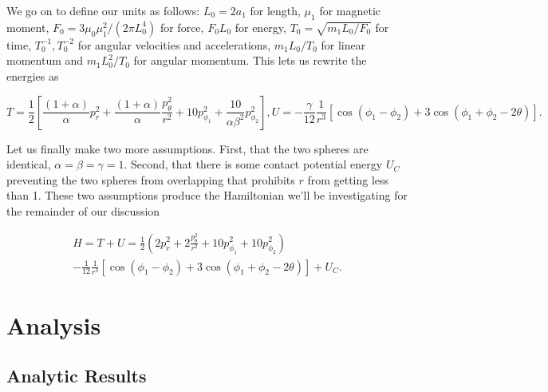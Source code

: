 \documentclass[prbg,preprint]{revtex4-1}
\begin{document}
We go on to define our units as follows: 
$L_0=2a_1$ for length,
$\mu_1$ for magnetic moment,
$F_0=3\mu_0 \mu_1^2/(2\pi L_0^4)$ for force,
$F_0L_0$ for energy,
$T_0=\sqrt{m_1L_0/F_0}$ for time,
$T_0^{-1},T_0^{-2}$ for angular velocities and accelerations,
$m_1L_0/T_0$ for linear momentum and 
$m_1L_0^2/T_0$ for angular momentum. This lets us rewrite the energies as

\begin{subequations}\label{gen_ham}
    \begin{equation}
        T=\frac{1}{2}\left [
	\frac{(1+\alpha)}{\alpha } p_r^2
	+\frac{(1+\alpha)}{\alpha } \frac{p_\theta^2}{r^2}
	+10 p_{\phi_1}^2 
	+\frac{10}{\alpha\beta^2} p_{\phi_2}^2      
        \right ],
    \end{equation}
    \begin{equation}
        U=
	    -\frac{\gamma}{12}
	    \frac{1}{r^3}[
	        \cos(\phi_1-\phi_2)
	        +3\cos(\phi_1+\phi_2 -2\theta)
	    ].
    \end{equation}
\end{subequations}

Let us finally make two more assumptions. First, that the two spheres are identical, $\alpha=\beta=\gamma=1$. Second, that there is some contact potential energy $U_C$ preventing the two spheres from overlapping that prohibits $r$ from getting less than 1. These two assumptions produce the Hamiltonian we'll be investigating for the remainder of our discussion

\begin{equation}
  \begin{multlined}
	H=T+U=
	\frac{1}{2}\left (
	2 p_r^2
	+2 \frac{p_\theta^2}{r^2}
	+10 p_{\phi_1}^2 
	+10 p_{\phi_2}^2      
        \right )
        \\
	-
	\frac{1}{12}
	\frac{1}{r^3}[
	        \cos(\phi_1-\phi_2)
	        +3\cos(\phi_1+\phi_2 -2\theta)
	    ]+U_C.
  \end{multlined}
\end{equation}

\section{Analysis}
\subsection{Analytic Results}
\end{document}
